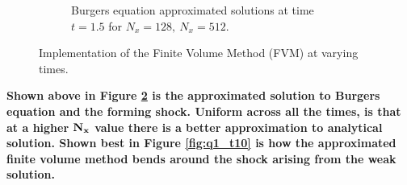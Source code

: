 \begin{enumerate}[label=\alph*., start = 2]
\begin{figure}[h!]
\begin{subfigure}[h]{0.7\linewidth}
            \caption{Burgers equation approximated solutions at time $t=1.5$ for $N_x=128,\ N_x =512$.}
            \label{fig:q1_t15}
        \end{subfigure}
        \caption{Implementation of the Finite Volume Method (FVM) at varying times.}
        \label{fig:q1_shocks}
    \end{figure}

    \begin{fminipage}{0.8\linewidth}
        \textbf{Shown above in Figure \ref{fig:q1_shocks} is the approximated solution to Burgers equation and the forming shock. Uniform across all the times, is that at a higher $\bf N_x$ value there is a better approximation to analytical solution. Shown best in Figure \ref{fig:q1_t10} is how the approximated finite volume method bends around the shock arising from the weak solution.}
    \end{fminipage}
\end{enumerate}
    
